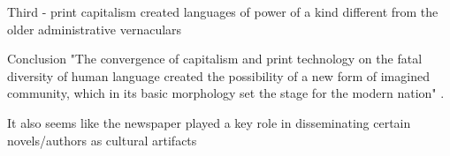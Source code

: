 \documentclass[12pt]{article}
\begin{document}
Third - print capitalism created languages of power of a kind different from the older administrative vernaculars

Conclusion
"The convergence of capitalism and print technology on the fatal diversity of human language created the possibility of a new form of imagined community, which in its basic morphology set the stage for the modern nation" \cite[46]{Anderson2006}.


It also seems like the newspaper played a key role in disseminating certain novels/authors as cultural artifacts 

\makeworkscited
\end{document}

